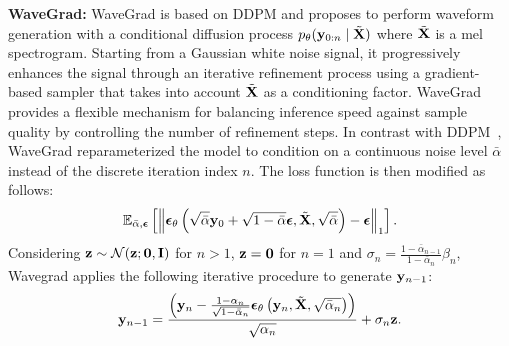 \textbf{WaveGrad:}  WaveGrad \cite{chen2020wavegrad} is based on DDPM and proposes to perform waveform generation with a conditional diffusion process $p_\theta(\mathbf{y}_{0:n} \mid \tilde{\bold{X}})$ where $\tilde{\bold{X}}$ is a mel spectrogram.
Starting from a Gaussian white noise signal, it progressively enhances the signal through an iterative refinement process using a gradient-based sampler that takes into account $\tilde{\mathbf{X}}$ as a conditioning factor.
WaveGrad provides a flexible mechanism for balancing inference speed against sample quality by controlling the number of refinement steps. 
In contrast with DDPM~\cite{ho2020denoising}, WaveGrad \cite{chen2020wavegrad} reparameterized the model to condition on a continuous noise level $\bar \alpha$ instead of the discrete iteration index $n$. The loss function is then modified as follows:
\begin{equation}
    \mathbb{E}_{\bar{\alpha}, \boldsymbol{\epsilon}}\left[\left\|\boldsymbol{\epsilon}_\theta\left(\sqrt{\bar{\alpha}} \mathbf{y}_0+\sqrt{1-\bar{\alpha}} \boldsymbol{\epsilon}, \tilde{\mathbf{X}}, \sqrt{\bar{\alpha}}\right)-\boldsymbol{\epsilon}\right\|_1\right].
\end{equation}
Considering $\mathbf{z} \sim \mathcal{N}(\mathbf{z}; \mathbf{0}, \mathbf{I})$ for $n > 1$, $\mathbf{z} = \mathbf{0}$ for $n=1$ and $\sigma_n = \frac{1 - \bar{\alpha}_{n - 1}}{1 - \bar{\alpha}_n}\beta_n$, Wavegrad applies the following iterative procedure to generate $\mathbf{y}_{n-1}$:
\begin{equation}
\mathbf{y}_{n-1}=\frac{\left(\mathbf{y}_n-\frac{1-\alpha_n}{\sqrt{1-\bar{\alpha}_n}} \boldsymbol{\epsilon}_\theta\left(\mathbf{y}_n, \tilde{\mathbf{X}}, \sqrt{\bar{\alpha}_n}\right)\right)}{\sqrt{\alpha_n}} + \sigma_n \mathbf{z}. \label{eq:wavegrad_gen}
\end{equation}

